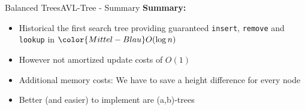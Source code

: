 
\begin{frame}{Balanced Trees}{AVL-Tree - Summary}
  \textbf{Summary:}
  \begin{itemize}
    \item<2->
      Historical the first search tree providing guaranteed
      \texttt{\color{Mittel-Blau}insert}, \texttt{\color{Mittel-Blau}remove}
      and \texttt{\color{Mittel-Blau}lookup} in
      ${\color{Mittel-Blau}O(\log n)}$
    \item<3->
      However not amortized update costs of {\color{Mittel-Blau}$O(1)$}
    \item<4->
      Additional memory costs:
      We have to save a height difference for every node
    \item<5->
      Better (and easier) to implement are {\color{Mittel-Blau}(a,b)}-trees
  \end{itemize}
\end{frame}
